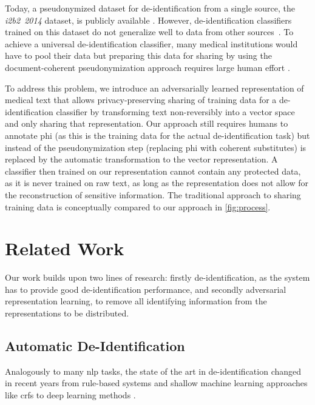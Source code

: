 %
Today, a pseudonymized dataset for de-identification from a single source, the \emph{i2b2~2014} dataset, is publicly available \citep{stubbs2015annotating}.
%
However, de-identification classifiers trained on this dataset do not generalize well to data from other sources~\citep{stubbs2017identification}.
%
To achieve a universal de-identification classifier, many medical institutions would have to pool their data but preparing this data for sharing by using the document-coherent pseudonymization approach requires large human effort \citep{dernoncourt2017identification}.

%
To address this problem, we introduce an adversarially learned representation of medical text that allows privacy-preserving sharing of training data for a de-identification classifier by transforming text non-reversibly into a vector space and only sharing that representation.
%
Our approach still requires humans to annotate \ac{phi} (as this is the training data for the actual de-identification task) but instead of the pseudonymization step (replacing \ac{phi} with coherent substitutes) is replaced by the automatic transformation to the vector representation.
%
A classifier then trained on our representation cannot contain any protected data, as it is never trained on raw text, as long as the representation does not allow for the reconstruction of sensitive information.
%
The traditional approach to sharing training data is conceptually compared to our approach in \cref{fig:process}.

\section{Related Work}\label{sec:related}
%
Our work builds upon two lines of research: firstly de-identification,
as the system has to provide good de-identification performance, and
secondly adversarial representation learning, to remove all identifying
information from the representations to be distributed.


\subsection{Automatic De-Identification}
%
Analogously to many \ac{nlp} tasks, the state of the art in de-identification changed in recent years from rule-based systems and shallow machine learning approaches like \acp{crf} \citep{uzuner2007evaluating,meystre2010automatic} to deep learning methods \citep{stubbs2017identification, dernoncourt2017identification, liu2017identification}.

